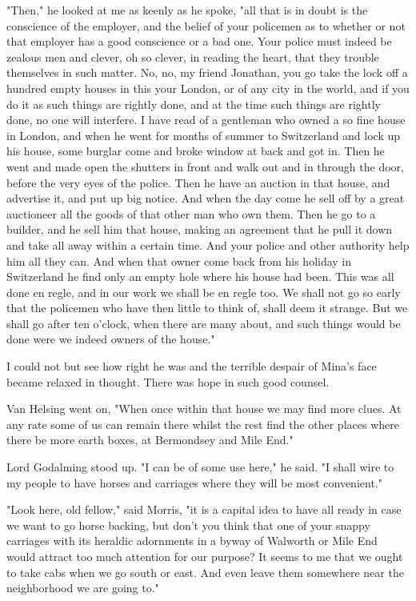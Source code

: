 "Then," he looked at me as keenly as he spoke, "all that is in doubt is the conscience of the employer, and the belief of your policemen as to whether or not that employer has a good conscience or a bad one. Your police must indeed be zealous men and clever, oh so clever, in reading the heart, that they trouble themselves in such matter. No, no, my friend Jonathan, you go take the lock off a hundred empty houses in this your London, or of any city in the world, and if you do it as such things are rightly done, and at the time such things are rightly done, no one will interfere. I have read of a gentleman who owned a so fine house in London, and when he went for months of summer to Switzerland and lock up his house, some burglar come and broke window at back and got in. Then he went and made open the shutters in front and walk out and in through the door, before the very eyes of the police. Then he have an auction in that house, and advertise it, and put up big notice. And when the day come he sell off by a great auctioneer all the goods of that other man who own them. Then he go to a builder, and he sell him that house, making an agreement that he pull it down and take all away within a certain time. And your police and other authority help him all they can. And when that owner come back from his holiday in Switzerland he find only an empty hole where his house had been. This was all done en regle, and in our work we shall be en regle too. We shall not go so early that the policemen who have then little to think of, shall deem it strange. But we shall go after ten o'clock, when there are many about, and such things would be done were we indeed owners of the house." 

I could not but see how right he was and the terrible despair of Mina's face became relaxed in thought. There was hope in such good counsel. 

Van Helsing went on, "When once within that house we may find more clues. At any rate some of us can remain there whilst the rest find the other places where there be more earth boxes, at Bermondsey and Mile End." 

Lord Godalming stood up. "I can be of some use here," he said. "I shall wire to my people to have horses and carriages where they will be most convenient." 

"Look here, old fellow," said Morris, "it is a capital idea to have all ready in case we want to go horse backing, but don't you think that one of your snappy carriages with its heraldic adornments in a byway of Walworth or Mile End would attract too much attention for our purpose? It seems to me that we ought to take cabs when we go south or east. And even leave them somewhere near the neighborhood we are going to." 

